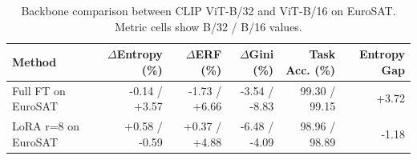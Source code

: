 \begin{table}[t]
\centering
\caption{Backbone comparison between CLIP ViT-B/32 and ViT-B/16 on EuroSAT. Metric cells show B/32 / B/16 values.}
\label{tab:backbone-comparison}
\small
\begin{tabular}{lrrrrr}
\toprule
Method & $\Delta$Entropy (\%) & $\Delta$ERF (\%) & $\Delta$Gini (\%) & Task Acc. (\%) & Entropy Gap \\
\midrule
Full FT on EuroSAT & -0.14 / +3.57 & -1.73 / +6.66 & -3.54 / -8.83 & 99.30 / 99.15 & +3.72 \\
LoRA r=8 on EuroSAT & +0.58 / -0.59 & +0.37 / +4.88 & -6.48 / -4.09 & 98.96 / 98.89 & -1.18 \\
\bottomrule
\end{tabular}
\end{table}
